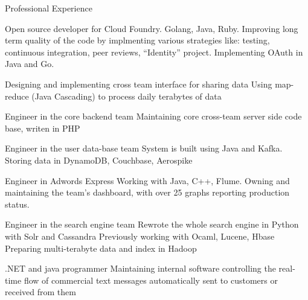 \begin{rubric}{\color{ForestGreen} Professional Experience}

   Open source developer
  for Cloud Foundry. Golang, Java, Ruby.
  Improving long term quality of the code by implmenting various
  strategies like: testing, continuous integration, peer reviews,
  \entry*``Identity'' project. Implementing OAuth in Java and Go.

   Designing and implementing cross team interface for sharing data
  Using map-reduce (Java Cascading) to process daily terabytes of data

   Engineer in the core backend team
  Maintaining core cross-team server side code base, writen in PHP

   Engineer in the user data-base team
  System is built using Java and Kafka. Storing data in DynamoDB,
  Couchbase, Aerospike

  \entry*[\color{ForestGreen} {Feb 13 - Sep 14}]  Engineer in {Adwords Express}
  Working with Java, C++, Flume. Owning and maintaining the team's
  dashboard, with over 25 graphs reporting production status.


  Engineer in the {search engine team}
  Rewrote the whole search engine in Python with Solr and Cassandra
  Previously working with Ocaml, Lucene, Hbase
  Preparing multi-terabyte data and index in Hadoop


  .NET and java programmer
  Maintaining internal software controlling the real-time flow of
  commercial text messages automatically sent to customers or received
  from them

\end{rubric}
